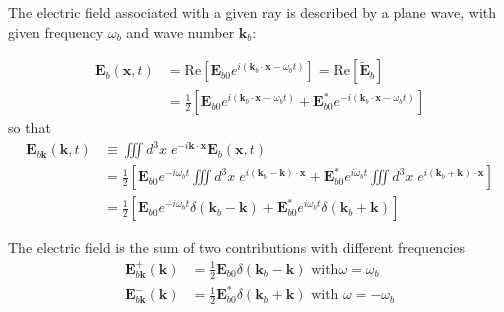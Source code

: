 The electric field associated with a given ray is described by a plane wave,
with given frequency $\omega_{b}$ and wave number $\mathbf{k}_{b}$:%

\begin{align}
\mathbf{E}_{b}\left(  \mathbf{x},t\right)   &  =\text{Re}\left[
\mathbf{E}_{b0}e^{i\left(  \mathbf{k}_{b}\cdot\mathbf{x}-\omega_{b}t\right)
}\right]  =\text{Re}\left[  \widetilde{\mathbf{E}}_{b}\right] \label{Ecomp}\\
&  =\frac{1}{2}\left[  \mathbf{E}_{b0}e^{i\left(  \mathbf{k}_{b}%
\cdot\mathbf{x}-\omega_{b}t\right)  }+\mathbf{E}_{b0}^{\ast}e^{-i\left(
\mathbf{k}_{b}\cdot\mathbf{x}-\omega_{b}t\right)  }\right]
\end{align}
so that
\begin{align}
\mathbf{E}_{b\mathbf{k}}\left(  \mathbf{k},t\right)   &  \equiv\iiint
d^{3}x\;e^{-i\mathbf{k}\cdot\mathbf{x}}\mathbf{E}_{b}\left(  \mathbf{x}%
,t\right) \nonumber\\
&  =\frac{1}{2}\left[  \mathbf{E}_{b0}e^{-i\omega_{b}t}\iiint d^{3}%
x\;e^{i\left(  \mathbf{k}_{b}-\mathbf{k}\right)  \cdot\mathbf{x}}%
+\mathbf{E}_{b0}^{\ast}e^{i\omega_{b}t}\iiint d^{3}x\;e^{i\left(
\mathbf{k}_{b}+\mathbf{k}\right)  \cdot\mathbf{x}}\right] \nonumber\\
&  =\frac{1}{2}\left[  \mathbf{E}_{b0}e^{-i\omega_{b}t}\delta\left(
\mathbf{k}_{b}-\mathbf{k}\right)  +\mathbf{E}_{b0}^{\ast}e^{i\omega_{b}%
t}\delta\left(  \mathbf{k}_{b}+\mathbf{k}\right)  \right]
\end{align}

The electric field is the sum of two contributions with different frequencies%
\begin{align}
\mathbf{E}_{b\mathbf{k}}^{+}\left(  \mathbf{k}\right)   &  =\frac{1}%
{2}\mathbf{E}_{b0}\delta\left(  \mathbf{k}_{b}-\mathbf{k}\right)  \text{ with
}\omega=\omega_{b}\\
\mathbf{E}_{b\mathbf{k}}^{-}\left(  \mathbf{k}\right)   &  =\frac{1}%
{2}\mathbf{E}_{b0}^{\ast}\delta\left(  \mathbf{k}_{b}+\mathbf{k}\right)
\text{ with }\omega=-\omega_{b}%
\end{align}


